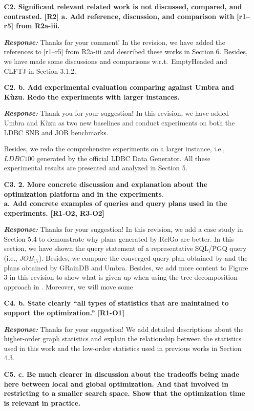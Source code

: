 \textbf{
C2. Significant relevant related work is not discussed, compared, and contrasted. [R2]
a. Add reference, discussion, and comparison with [r1–r5] from R2a-iii.
}

\textbf{\textit{Response: }}
Thanks for your comment! In the revision, we have added the references to [r1--r5] from R2a-iii and described these works in Section 6.
Besides, we have made some discussions and comparisons w.r.t.~EmptyHeaded and CLFTJ in Section 3.1.2.


\textbf{C2. b. Add experimental evaluation comparing against Umbra and Kùzu. Redo the experiments with larger instances.}

\textbf{\textit{Response: }}
Thank you for your suggestion! 
In this revision, we have added Umbra and K\`uzu as two new baselines and conduct experiments on both the LDBC SNB and JOB benchmarks.

Besides, we redo the comprehensive experiments on a larger instance, i.e., $LDBC100$ generated by the official LDBC Data Generator.
All these experimental results are presented and analyzed in Section 5.


\textbf{
C3. 2. More concrete discussion and explanation about the optimization platform and in the experiments. \\
a. Add concrete examples of queries and query plans used in the experiments. [R1-O2, R3-O2]
}

\textbf{\textit{Response: }}
Thanks for your suggestion! In this revision, we add a case study in Section 5.4 to demonstrate why plans generated by RelGo are better.
In this section, we have shown the query statement of a representative SQL/PGQ query (i.e., $JOB_{17}$).
Besides, we compare the converged query plan obtained by \name and the plans obtained by GRainDB and Umbra.
Besides, we add more content to Figure 3 in this revision to show what is given up when using the tree decomposition approach in \name.
Moreover, we will move some 


\textbf{
C4. b. State clearly “all types of statistics that are maintained to support the optimization.” [R1-O1]}

\textbf{\textit{Response: }}
Thanks for your suggestion! 
We add detailed descriptions about the higher-order graph statistics and explain the relationship between the statistics used in this work and the low-order statistics used in previous works in Section 4.3.


\textbf{
C5. c. Be much clearer in discussion about the tradeoffs being made here between local and global optimization. And that involved in restricting to a smaller search space. Show that the optimization time is relevant in practice.}

